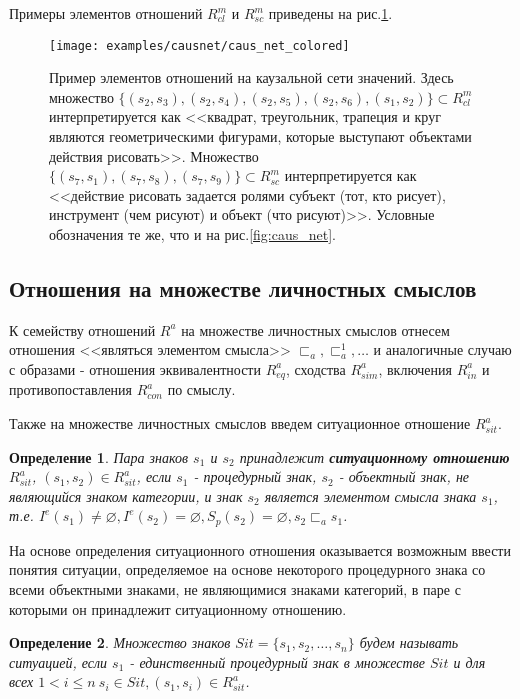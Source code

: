 \documentclass[12pt]{scrartcl}
\newtheorem{definition}{Определение}
\begin{document}
	Примеры элементов отношений $R_{cl}^m$ и $R_{sc}^m$ приведены на рис.\ref{fig:signif_relat}.


	\begin{figure}
		\centering
		\texttt{[image: examples/causnet/caus\_net\_colored]}
		\caption{Пример элементов отношений на каузальной сети значений. Здесь множество $\{(s_2,s_3),(s_2,s_4),(s_2,s_5),(s_2,s_6),(s_1,s_2)\}\subset R_{cl}^m$ интерпретируется как <<квадрат, треугольник, трапеция и круг являются геометрическими фигурами, которые выступают объектами действия рисовать>>. Множество $\{(s_7,s_1),(s_7,s_8),(s_7,s_9)\}\subset R_{sc}^m$ интерпретируется как <<действие рисовать задается ролями субъект (тот, кто рисует), инструмент (чем рисуют) и объект (что рисуют)>>. Условные обозначения те же, что и на рис.\ref{fig:caus_net}.}
		\label{fig:signif_relat}		
	\end{figure}
	
	\subsection{Отношения на множестве личностных смыслов}	
	К семейству отношений $R^a$ на множестве личностных смыслов отнесем отношения <<являться элементом смысла>> ${\sqsubset_a,\sqsubset_a^1,\dots}$ и аналогичные случаю с образами - отношения эквивалентности $R_{eq}^a$, сходства $R_{sim}^a$, включения $R_{in}^a$ и противопоставления $R_{con}^a$ по смыслу.
	
	Также на множестве личностных смыслов введем ситуационное отношение $R_{sit}^a$.

	\begin{definition}
		Пара знаков $s_1$ и $s_2$ принадлежит \textbf{ситуационному отношению} $R_{sit}^a$, $(s_1,s_2)\in R_{sit}^a$, если $s_1$ - процедурный знак, $s_2$ - объектный знак, не являющийся знаком категории, и знак $s_2$ является элементом смысла знака $s_1$, т.е. $I^e(s_1)\not = \varnothing, I^e(s_2) = \varnothing, S_p(s_2)=\varnothing, s_2\sqsubset_a s_1$.
	\end{definition}
	
	На основе определения ситуационного отношения оказывается возможным ввести понятия ситуации, определяемое на основе некоторого процедурного знака со всеми объектными знаками, не являющимися знаками категорий, в паре с которыми он принадлежит ситуационному отношению.
	
	\begin{definition}
		Множество знаков $Sit=\{s_1,s_2,\dots,s_n\}$ будем называть \textit{ситуацией}, если $s_1$ - единственный процедурный знак в множестве $Sit$ и для всех $1<i\leq n\ s_i\in Sit, (s_1,s_i)\in R_{sit}^a$.
	\end{definition}
	
\end{document}

